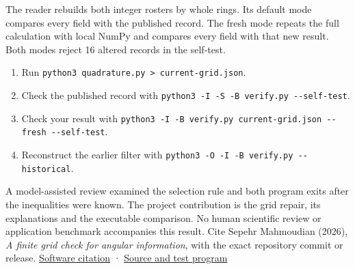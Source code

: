 The reader rebuilds both integer rosters by whole rings. Its default mode compares every field with the published record. The fresh mode repeats the full calculation with local NumPy and compares every field with that new result. Both modes reject 16 altered records in the self-test.

\begin{enumerate}
\def\labelenumi{\arabic{enumi}.}
\tightlist
\item
  Run \texttt{python3\ quadrature.py\ \textgreater{}\ current-grid.json}.
\item
  Check the published record with \texttt{python3\ -I\ -S\ -B\ verify.py\ -\/-self-test}.
\item
  Check your result with \texttt{python3\ -I\ -B\ verify.py\ current-grid.json\ -\/-fresh\ -\/-self-test}.
\item
  Reconstruct the earlier filter with \texttt{python3\ -O\ -I\ -B\ verify.py\ -\/-historical}.
\end{enumerate}

A model-assisted review examined the selection rule and both program exits after the inequalities were known. The project contribution is the grid repair, its explanations and the executable comparison. No human scientific review or application benchmark accompanies this result. Cite Sepehr Mahmoudian (2026), \emph{A finite grid check for angular information}, with the exact repository commit or release. \href{https://github.com/sepahead/pid-rs/blob/main/CITATION.cff}{Software citation} · \href{https://github.com/sepahead/pid-rs/blob/main/audit/research/angular-quadrature-grid/quadrature.py}{Source and test program}
